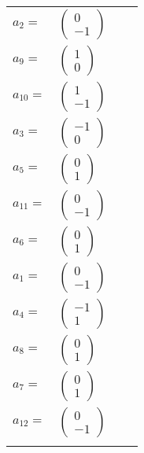 \documentclass[1p]{elsarticle_modified}
\theoremstyle{definition}
\begin{document}
\begin{tabular}{m{7pt} m{180pt} m{7pt} m{180pt} }
\flushright $a_{2}=$&$\begin{pmatrix}0\\-1\end{pmatrix}$ \\
\flushright $a_{9}=$&$\begin{pmatrix}1\\0\end{pmatrix}$ \\
\flushright $a_{10}=$&$\begin{pmatrix}1\\-1\end{pmatrix}$ \\
\flushright $a_{3}=$&$\begin{pmatrix}-1\\0\end{pmatrix}$ \\
\flushright $a_{5}=$&$\begin{pmatrix}0\\1\end{pmatrix}$ \\
\flushright $a_{11}=$&$\begin{pmatrix}0\\-1\end{pmatrix}$ \\
\flushright $a_{6}=$&$\begin{pmatrix}0\\1\end{pmatrix}$ \\
\flushright $a_{1}=$&$\begin{pmatrix}0\\-1\end{pmatrix}$ \\
\flushright $a_{4}=$&$\begin{pmatrix}-1\\1\end{pmatrix}$ \\
\flushright $a_{8}=$&$\begin{pmatrix}0\\1\end{pmatrix}$ \\
\flushright $a_{7}=$&$\begin{pmatrix}0\\1\end{pmatrix}$ \\
\flushright $a_{12}=$&$\begin{pmatrix}0\\-1\end{pmatrix}$\\&\end{tabular}
\end{document}
